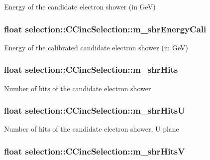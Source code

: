 Energy of the candidate electron shower (in Ge\-V) \hypertarget{classselection_1_1CCincSelection_adec1b19741776f6e33a88b4d0f2b6330}{
\subsubsection[{m\-\_\-shr\-Energy\-Cali}]{\setlength{\rightskip}{0pt plus 5cm}float selection\-::\-C\-Cinc\-Selection\-::m\-\_\-shr\-Energy\-Cali\hspace{0.3cm}{\ttfamily [private]}}}\label{classselection_1_1CCincSelection_adec1b19741776f6e33a88b4d0f2b6330}
Energy of the calibrated candidate electron shower (in Ge\-V) \hypertarget{classselection_1_1CCincSelection_a964f3aac8e99293d36792be15e9f2816}{
\subsubsection[{m\-\_\-shr\-Hits}]{\setlength{\rightskip}{0pt plus 5cm}float selection\-::\-C\-Cinc\-Selection\-::m\-\_\-shr\-Hits\hspace{0.3cm}{\ttfamily [private]}}}\label{classselection_1_1CCincSelection_a964f3aac8e99293d36792be15e9f2816}
Number of hits of the candidate electron shower \hypertarget{classselection_1_1CCincSelection_a838d15088def4e962fdd1b664c5960e1}{
\subsubsection[{m\-\_\-shr\-Hits\-U}]{\setlength{\rightskip}{0pt plus 5cm}float selection\-::\-C\-Cinc\-Selection\-::m\-\_\-shr\-Hits\-U\hspace{0.3cm}{\ttfamily [private]}}}\label{classselection_1_1CCincSelection_a838d15088def4e962fdd1b664c5960e1}
Number of hits of the candidate electron shower, U plane \hypertarget{classselection_1_1CCincSelection_a35d27e317a7c161b6051fde267d08850}{
\subsubsection[{m\-\_\-shr\-Hits\-V}]{\setlength{\rightskip}{0pt plus 5cm}float selection\-::\-C\-Cinc\-Selection\-::m\-\_\-shr\-Hits\-V\hspace{0.3cm}{\ttfamily [private]}}}\label{classselection_1_1CCincSelection_a35d27e317a7c161b6051fde267d08850}
